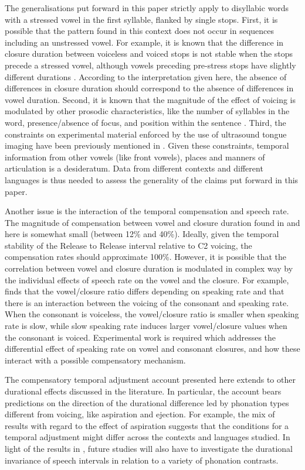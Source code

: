 \documentclass[12pt,]{article}
\begin{document}
The generalisations put forward in this paper strictly apply to
disyllabic words with a stressed vowel in the first syllable, flanked by
single stops. First, it is possible that the pattern found in this
context does not occur in sequences including an unstressed vowel. For
example, it is known that the difference in closure duration between
voiceless and voiced stops is not stable when the stops precede a
stressed vowel, although vowels preceding pre-stress stops have slightly
different durations \citep{davis1989}. According to the interpretation
given here, the absence of differences in closure duration should
correspond to the absence of differences in vowel duration. Second, it
is known that the magnitude of the effect of voicing is modulated by
other prosodic characteristics, like the number of syllables in the
word, presence/absence of focus, and position within the sentence
\citep{sharf1962, klatt1973, laeufer1992, de-jong2004}. Third, the
constraints on experimental material enforced by the use of ultrasound
tongue imaging have been previously mentioned in .
Given these constraints, temporal information from other vowels (like
front vowels), places and manners of articulation is a desideratum. Data
from different contexts and different languages is thus needed to assess
the generality of the claims put forward in this paper.

Another issue is the interaction of the temporal compensation and speech
rate. The magnitude of compensation between vowel and closure duration
found in \citet{de-jong1991} and here is somewhat small (between 12\%
and 40\%). Ideally, given the temporal stability of the Release to
Release interval relative to C2 voicing, the compensation rates should
approximate 100\%. However, it is possible that the correlation between
vowel and closure duration is modulated in complex way by the individual
effects of speech rate on the vowel and the closure. For example,
\citet{ko2018} finds that the vowel/closure ratio differs depending on
speaking rate and that there is an interaction between the voicing of
the consonant and speaking rate. When the consonant is voiceless, the
vowel/closure ratio is smaller when speaking rate is slow, while slow
speaking rate induces larger vowel/closure values when the consonant is
voiced. Experimental work is required which addresses the differential
effect of speaking rate on vowel and consonant closures, and how these
interact with a possible compensatory mechanism.

The compensatory temporal adjustment account presented here extends to
other durational effects discussed in the literature. In particular, the
account bears predictions on the direction of the durational difference
led by phonation types different from voicing, like aspiration and
ejection. For example, the mix of results with regard to the effect of
aspiration \citep{durvasula2012} suggests that the conditions for a
temporal adjustment might differ across the contexts and languages
studied. In light of the results in \citet{begus2017}, future studies
will also have to investigate the durational invariance of speech
intervals in relation to a variety of phonation contrasts.
\end{document}
